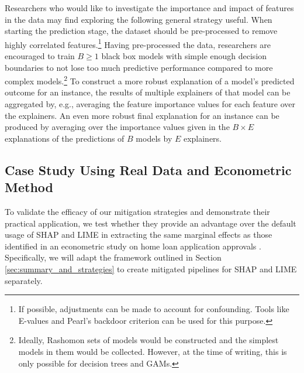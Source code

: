 \documentclass[12pt]{article}  %
\begin{document}
            Researchers who would like to investigate the importance and impact of features in the data may find exploring the following general strategy useful.
            When starting the prediction stage, the dataset should be pre-processed to remove highly correlated features.\footnote{If possible, adjustments can be made to account for confounding. Tools like E-values\citep{gaster2023quantifying} and Pearl's backdoor criterion can be used for this purpose.} %
            Having pre-processed the data, researchers are encouraged to train $B\geq 1$ black box models with simple enough decision boundaries to not lose too much predictive performance compared to more complex models.\footnote{Ideally, Rashomon sets of models would be constructed and the simplest models in them would be collected. However, at the time of writing, this is only possible for decision trees and GAMs.} To construct a more robust explanation of a model's predicted outcome for an instance, the results of multiple explainers of that model can be aggregated by, e.g., averaging the feature importance values for each feature over the explainers. An even more robust final explanation for an instance can be produced by averaging over the importance values given in the $B\times E$ explanations of the predictions of $B$ models by $E$ explainers.
          


\subsection{Case Study Using Real Data and Econometric Method}
    \label{sec:case_study}
    To validate the efficacy of our mitigation strategies and demonstrate their practical application, we test whether they provide an advantage over the default usage of SHAP and LIME in extracting the same marginal effects as those identified in an econometric study on home loan application approvals \citep{bane2006econometric}. Specifically, we will adapt the framework outlined in Section \ref{sec:summary_and_strategies} to create mitigated pipelines for SHAP and LIME separately.
    
\end{document}
